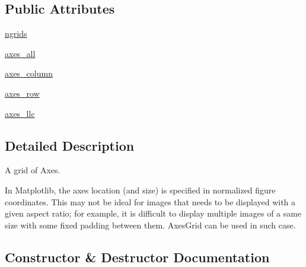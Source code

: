 \subsection*{Public Attributes}
\begin{DoxyCompactItemize}
\item 
\hyperlink{classaxes__grid1_1_1axes__grid_1_1Grid_ac03a9489d1bf668d1c2e7a476093cf2a}{ngrids}
\item 
\hyperlink{classaxes__grid1_1_1axes__grid_1_1Grid_a665d3a668cf5e79dcdeb990e02d10626}{axes\+\_\+all}
\item 
\hyperlink{classaxes__grid1_1_1axes__grid_1_1Grid_ad6a524cf270f69f64b41435cf56de65a}{axes\+\_\+column}
\item 
\hyperlink{classaxes__grid1_1_1axes__grid_1_1Grid_abb3a101a55edfa131b49e0b523696f7a}{axes\+\_\+row}
\item 
\hyperlink{classaxes__grid1_1_1axes__grid_1_1Grid_a4b9351c389e132f51bcb5f0129f45f05}{axes\+\_\+llc}
\end{DoxyCompactItemize}


\subsection{Detailed Description}
\begin{DoxyVerb}A grid of Axes.

In Matplotlib, the axes location (and size) is specified in normalized
figure coordinates. This may not be ideal for images that needs to be
displayed with a given aspect ratio; for example, it is difficult to
display multiple images of a same size with some fixed padding between
them.  AxesGrid can be used in such case.
\end{DoxyVerb}
 

\subsection{Constructor \& Destructor Documentation}
\mbox{\label{classaxes__grid1_1_1axes__grid_1_1Grid_ae3f8ee007aef094379548c45547b1c16}} 

